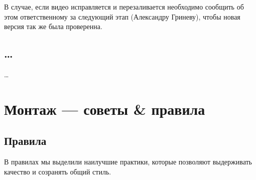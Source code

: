 \documentclass[
a4paper, %
12pt, %
article,
onecolumn, %
openany, %
]{memoir}
\begin{document}
В случае, если видео исправляется и перезаливается необходимо сообщить об этом ответственному за следующий этап (Александру Гриневу), чтобы новая версия так же была проверенна.

\subsection{\ldots}
\ldots

\newpage
\section{Монтаж --- советы \& правила}\label{montageRules}
\subsection{Правила}
В правилах мы выделили наилучшие практики, которые позволяют выдерживать качество и созранять общий стиль.
\end{document}
